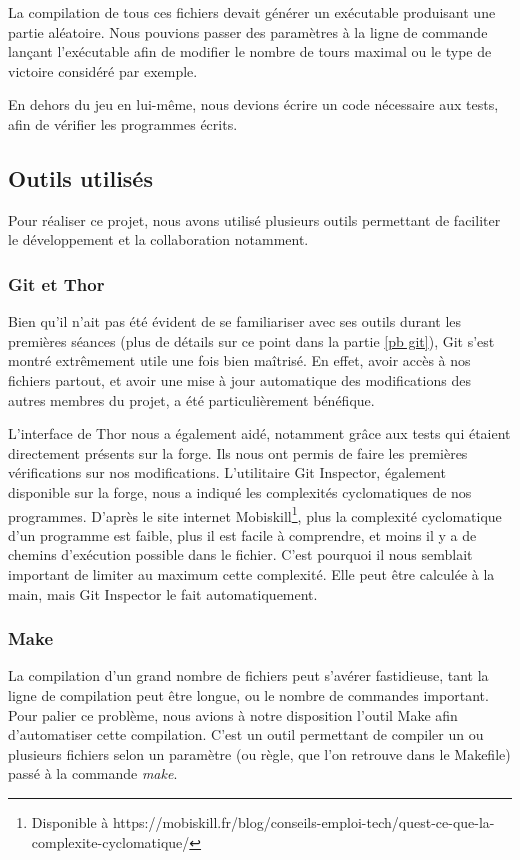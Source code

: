 \documentclass[a4paper]{article}
\begin{document}
La compilation de tous ces fichiers devait générer un exécutable produisant une partie aléatoire. Nous pouvions passer des paramètres à la ligne de commande lançant l'exécutable afin de modifier le nombre de tours maximal ou le type de victoire considéré par exemple.

En dehors du jeu en lui-même, nous devions écrire un code nécessaire aux tests, afin de vérifier les programmes écrits.

\subsection{Outils utilisés}
\label{outils}
Pour réaliser ce projet, nous avons utilisé plusieurs outils permettant de faciliter le développement et la collaboration notamment.

\subsubsection{Git et Thor}
\label{git}
Bien qu'il n'ait pas été évident de se familiariser avec ses outils durant les premières séances (plus de détails sur ce point dans la partie \ref{pb git}), Git s'est montré extrêmement utile une fois bien maîtrisé. En effet, avoir accès à nos fichiers partout, et avoir une mise à jour automatique des modifications des autres membres du projet, a été particulièrement bénéfique.

L'interface de Thor nous a également aidé, notamment grâce aux tests qui étaient directement présents sur la forge. Ils nous ont permis de faire les premières vérifications sur nos modifications. L'utilitaire Git Inspector, également disponible sur la forge, nous a indiqué les complexités cyclomatiques de nos programmes. D'après le site internet Mobiskill\footnote{Disponible à https://mobiskill.fr/blog/conseils-emploi-tech/quest-ce-que-la-complexite-cyclomatique/}, plus la complexité cyclomatique d'un programme est faible, plus il est facile à comprendre, et moins il y a de chemins d'exécution possible dans le fichier. C'est pourquoi il nous semblait important de limiter au maximum cette complexité. Elle peut être calculée à la main, mais Git Inspector le fait automatiquement.

\subsubsection{Make}
\label{makefile}
La compilation d'un grand nombre de fichiers peut s'avérer fastidieuse, tant la ligne de compilation peut être longue, ou le nombre de commandes important. Pour palier ce problème, nous avions à notre disposition l'outil Make afin d'automatiser cette compilation. C'est un outil permettant de compiler un ou plusieurs fichiers selon un paramètre (ou règle, que l'on retrouve dans le Makefile) passé à la commande \emph{make}.
\end{document}
